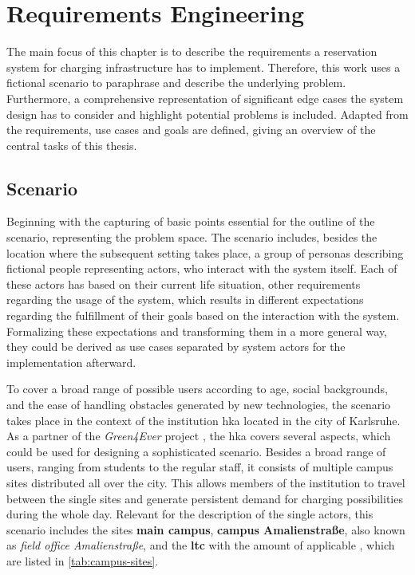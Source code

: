 
\chapter{Requirements Engineering}
\label{ch:Requirements Engineering}

The main focus of this chapter is to describe the requirements a reservation system for charging infrastructure has to implement.
Therefore, this work uses a fictional scenario to paraphrase and describe the underlying problem. Furthermore, a comprehensive representation of significant edge cases the system design has to consider and highlight potential problems is included.
Adapted from the requirements, use cases and goals are defined, giving an overview of the central tasks of this thesis.

\section{Scenario}
\label{ch:Requirements Engineering:sec:Scenario}

Beginning with the capturing of basic points essential for the outline of the scenario, representing the problem space.
The scenario includes, besides the location where the subsequent setting takes place, a group of personas describing fictional people representing actors, who interact with the system itself.
Each of these actors has based on their current life situation, other requirements regarding the usage of the system, which results in different expectations regarding the fulfillment of their goals based on the interaction with the system.
Formalizing these expectations and transforming them in a more general way, they could be derived as use cases separated by system actors for the implementation afterward.

\noindent To cover a broad range of possible users according to age, social backgrounds, and the ease of handling obstacles generated by new technologies, the scenario takes place in the context of the institution \acrfull{hka} located in the city of Karlsruhe.
As a partner of the \textit{Green4Ever} project \cite{noauthor_hka_nodate}, the \acrshort{hka} covers several aspects, which could be used for designing a sophisticated scenario. Besides a broad range of users, ranging from students to the regular staff, it consists of multiple campus sites distributed all over the city.
This allows members of the institution to travel between the single sites and generate persistent demand for charging possibilities during the whole day.
Relevant for the description of the single actors, this scenario includes the sites \textbf{main campus}, \textbf{campus Amalienstraße}, also known as \textit{field office Amalienstraße}, and the \textbf{\acrfull{ltc}} with the amount of applicable , which are listed in \ref{tab:campus-sites}.

